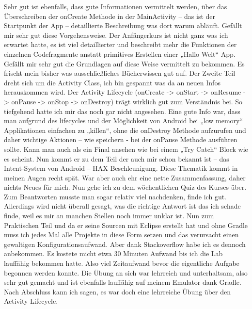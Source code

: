 \documentclass[12pt,a4paper,bibliography=totocnumbered,listof=totocnumbered]{scrartcl}
\begin{document}
Sehr gut ist ebenfalls, dass gute Informationen vermittelt werden, über das Überschreiben der onCreate Methode in der MainActivity – das ist der Startpunkt der App – detaillierte Beschreibung was dort warum abläuft. Gefällt mir sehr gut diese Vorgehensweise. 
Der Anfängerkurs ist nicht ganz was ich erwartet hatte, es ist viel detaillierter und beschreibt mehr die Funktionen der einzelnen Codefragmente anstatt primitives Erstellen einer „Hallo Welt“ App. Gefällt mir sehr gut die Grundlagen auf diese Weise vermittelt zu bekommen. Es frischt mein bisher was ausschließliches Bücherwissen gut auf. 
Der Zweite Teil dreht sich um die Activity Class, ich bin gespannt was da an neuen Infos herauskommen wird. Der Activity Lifecycle (onCreate -> onStart -> onResume -> onPause -> onStop -> onDestroy) trägt wirklich gut zum Verständnis bei. So tiefgehend hatte ich mir das noch gar nicht angesehen. 
Eine gute Info war, dass man aufgrund des lifecycles und der Möglichkeit von Android bei „low memory“ Applikationen einfachen zu „killen“, ohne die onDestroy Methode aufzurufen und daher wichtige Aktionen – wie speichern - bei der onPause Methode ausführen sollte. Kann man auch als ein Final ansehen wie bei einem „Try Catch“ Block wie es scheint. Nun kommt er zu dem Teil der auch mir schon bekannt ist – das Intent-System von Android – HAX Beschleunigung. Diese Thematik kommt in meinen Augen recht spät. War aber auch ehr eine nette Zusammenfassung, daher nichts Neues für mich. 
Nun gehe ich zu dem wöchentlichen Quiz des Kurses über. Zum Beantworten musste man sogar relativ viel nachdenken, finde ich gut. Allerdings wird nicht überall gesagt, was die richtige Antwort ist das ich schade finde, weil es mir an manchen Stellen noch immer unklar ist. 
Nun zum Praktischen Teil und da er seine Sourcen mit Eclipse erstellt hat und ohne Gradle muss ich jedes Mal alle Projekte in diese Form setzen und das verursacht einen gewaltigen Konfigurationsaufwand. 
Aber dank Stackoverflow habe ich es dennoch anbekommen. Es kostete micht etwa 30 Minuten Aufwand bis ich die Lab lauffähig bekommen hatte.  Also viel Zeitaufwand bevor die eigentliche Aufgabe begonnen werden konnte. 
Die Übung an sich war lehrreich und unterhaltsam, also sehr gut gemacht und ist ebenfalls lauffähig auf meinem Emulator dank Gradle. 
Nach Abschluss kann ich sagen, es war doch eine lehrreiche Übung über den Activity Lifecycle. 
\end{document}
